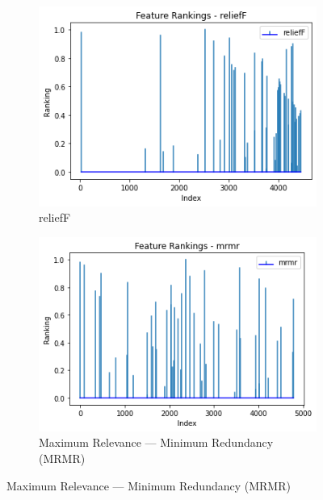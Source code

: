 \documentclass{article}
\begin{document}
\begin{figure}[htb]
  \centering
  \begin{subfigure}[b]{\linewidth}
    \includegraphics[width=1\linewidth]{part_rankings_k-50_reliefF.png}
    \caption{reliefF}
    \label{fig:part-rankings-reliefF}
  \end{subfigure}

  \begin{subfigure}[b]{\linewidth}
    \includegraphics[width=1\linewidth]{part_rankings_k-50_mrmr.png}
    \caption{Maximum Relevance — Minimum Redundancy (MRMR)}
    \label{fig:part-rankings-mrmr}
  \end{subfigure}


\end{figure}
\end{document}
